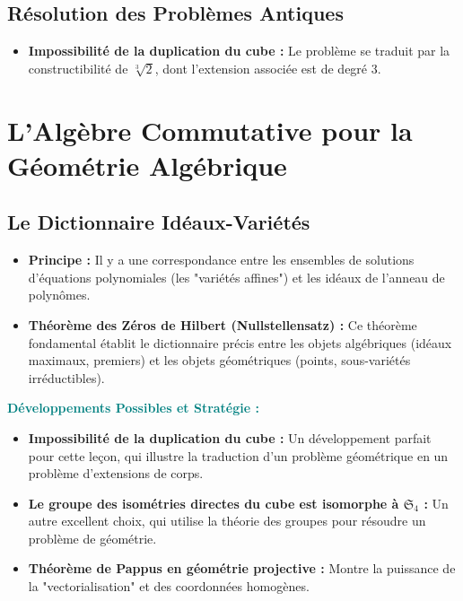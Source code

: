 \documentclass[12pt, a4paper, parskip=full]{report}
\theoremstyle{agregstyle}
\newenvironment{developpements}
  {\par\medskip\noindent\begin{oframed}\noindent\textbf{\textcolor{teal}{Développements Possibles et Stratégie :}}}
  {\end{oframed}\par\medskip}
\begin{document}
\subsection{Résolution des Problèmes Antiques}
\begin{itemize}
    \item \textbf{Impossibilité de la duplication du cube :} Le problème se traduit par la constructibilité de $\sqrt[3]{2}$, dont l'extension associée est de degré 3.
\end{itemize}

\section{L'Algèbre Commutative pour la Géométrie Algébrique}
\subsection{Le Dictionnaire Idéaux-Variétés}
\begin{itemize}
    \item \textbf{Principe :} Il y a une correspondance entre les ensembles de solutions d'équations polynomiales (les "variétés affines") et les idéaux de l'anneau de polynômes.
    \item \textbf{Théorème des Zéros de Hilbert (Nullstellensatz) :} Ce théorème fondamental établit le dictionnaire précis entre les objets algébriques (idéaux maximaux, premiers) et les objets géométriques (points, sous-variétés irréductibles).
\end{itemize}

\begin{developpements}
    \begin{itemize}
        \item \textbf{Impossibilité de la duplication du cube :} Un développement parfait pour cette leçon, qui illustre la traduction d'un problème géométrique en un problème d'extensions de corps.
        \item \textbf{Le groupe des isométries directes du cube est isomorphe à $\mathfrak{S}_4$ :} Un autre excellent choix, qui utilise la théorie des groupes pour résoudre un problème de géométrie.
        \item \textbf{Théorème de Pappus en géométrie projective :} Montre la puissance de la "vectorialisation" et des coordonnées homogènes.
    \end{itemize}
\end{developpements}
\end{document}

